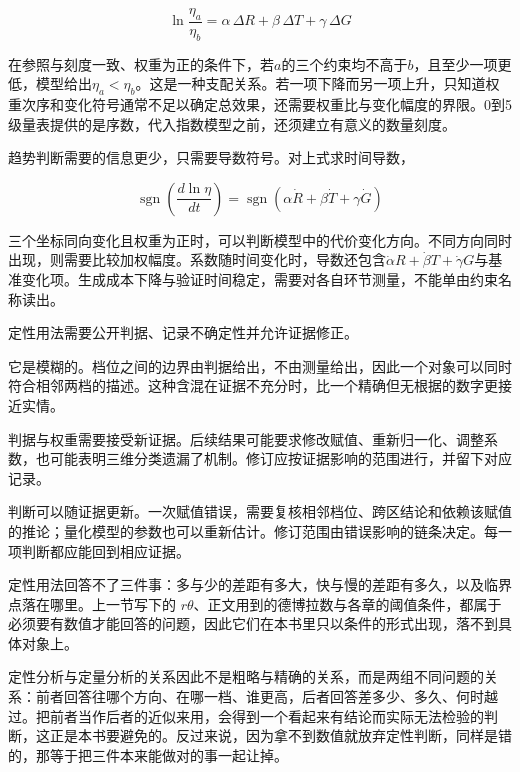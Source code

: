 \begin{equation}
\ln\frac{\eta_{a}}{\eta_{b}}
=\alpha\,\Delta R+\beta\,\Delta T+\gamma\,\Delta G
\end{equation}

在参照与刻度一致、权重为正的条件下，若$a$的三个约束均不高于$b$，且至少一项更低，模型给出$\eta_a<\eta_b$。这是一种支配关系。若一项下降而另一项上升，只知道权重次序和变化符号通常不足以确定总效果，还需要权重比与变化幅度的界限。0到5级量表提供的是序数，代入指数模型之前，还须建立有意义的数量刻度。


趋势判断需要的信息更少，只需要导数符号。对上式求时间导数，

\begin{equation}
\operatorname{sgn}\!\left(\frac{d\ln\eta}{dt}\right)
=\operatorname{sgn}\!\left(\alpha\dot{R}+\beta\dot{T}+\gamma\dot{G}\right)
\end{equation}

三个坐标同向变化且权重为正时，可以判断模型中的代价变化方向。不同方向同时出现，则需要比较加权幅度。系数随时间变化时，导数还包含$\dot\alpha R+\dot\beta T+\dot\gamma G$与基准变化项。生成成本下降与验证时间稳定，需要对各自环节测量，不能单由约束名称读出。


定性用法需要公开判据、记录不确定性并允许证据修正。

它是模糊的。档位之间的边界由判据给出，不由测量给出，因此一个对象可以同时符合相邻两档的描述。这种含混在证据不充分时，比一个精确但无根据的数字更接近实情。

判据与权重需要接受新证据。后续结果可能要求修改赋值、重新归一化、调整系数，也可能表明三维分类遗漏了机制。修订应按证据影响的范围进行，并留下对应记录。

判断可以随证据更新。一次赋值错误，需要复核相邻档位、跨区结论和依赖该赋值的推论；量化模型的参数也可以重新估计。修订范围由错误影响的链条决定。每一项判断都应能回到相应证据。


定性用法回答不了三件事：多与少的差距有多大，快与慢的差距有多久，以及临界点落在哪里。上一节写下的 $r\theta$、正文用到的德博拉数与各章的阈值条件，都属于必须要有数值才能回答的问题，因此它们在本书里只以条件的形式出现，落不到具体对象上。

定性分析与定量分析的关系因此不是粗略与精确的关系，而是两组不同问题的关系：前者回答往哪个方向、在哪一档、谁更高，后者回答差多少、多久、何时越过。把前者当作后者的近似来用，会得到一个看起来有结论而实际无法检验的判断，这正是本书要避免的。反过来说，因为拿不到数值就放弃定性判断，同样是错的，那等于把三件本来能做对的事一起让掉。
